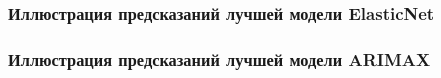 \documentclass[aspectratio=169,8pt]{beamer}
\begin{document}
\begin{frame}
\frametitle{Иллюстрация предсказаний лучшей модели ElasticNet}

\begin{figure}[h!]
        \captionsetup{labelformat=empty}
        \vspace{-2.3em}
        \caption[scale=0.25]{}
\end{figure}
\end{frame}

\begin{frame}
\frametitle{Иллюстрация предсказаний лучшей модели ARIMAX}

\begin{figure}[h!]
        \captionsetup{labelformat=empty}
        \vspace{-2.3em}
        \caption[scale=0.25]{}
\end{figure}
\end{frame}
\end{document}
